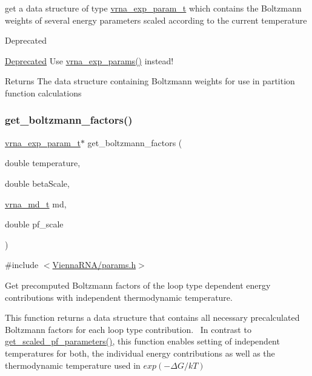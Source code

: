 get a data structure of type \hyperlink{group__energy__parameters_ga01d8b92fe734df8d79a6169482c7d8d8}{vrna\+\_\+exp\+\_\+param\+\_\+t} which contains the Boltzmann weights of several energy parameters scaled according to the current temperature

\begin{DoxyRefDesc}{Deprecated}
\item[\hyperlink{deprecated__deprecated000092}{Deprecated}]Use \hyperlink{group__energy__parameters_gab1f3016f96aa96bff020cdd904605afa}{vrna\+\_\+exp\+\_\+params()} instead!\end{DoxyRefDesc}


\begin{DoxyReturn}{Returns}
The data structure containing Boltzmann weights for use in partition function calculations 
\end{DoxyReturn}
\mbox{\label{group__energy__parameters_gaef2b931c7e9d4ffb0a5c33df50ec2068}} 
\subsubsection{\texorpdfstring{get\+\_\+boltzmann\+\_\+factors()}{get\_boltzmann\_factors()}}
{\footnotesize\ttfamily \hyperlink{group__energy__parameters_ga01d8b92fe734df8d79a6169482c7d8d8}{vrna\+\_\+exp\+\_\+param\+\_\+t}$\ast$ get\+\_\+boltzmann\+\_\+factors (\begin{DoxyParamCaption}\item[{double}]{temperature,  }\item[{double}]{beta\+Scale,  }\item[{\hyperlink{group__model__details_ga1f8a10e12a0a1915f2a4eff0b28ea17c}{vrna\+\_\+md\+\_\+t}}]{md,  }\item[{double}]{pf\+\_\+scale }\end{DoxyParamCaption})}



{\ttfamily \#include $<$\hyperlink{params_8h}{Vienna\+R\+N\+A/params.\+h}$>$}



Get precomputed Boltzmann factors of the loop type dependent energy contributions with independent thermodynamic temperature. 

This function returns a data structure that contains all necessary precalculated Boltzmann factors for each loop type contribution.~\newline
 In contrast to \hyperlink{group__energy__parameters_gabf3b9271c41dd3fac02d56e0b02b3344}{get\+\_\+scaled\+\_\+pf\+\_\+parameters()}, this function enables setting of independent temperatures for both, the individual energy contributions as well as the thermodynamic temperature used in $ exp(-\Delta G / kT) $

